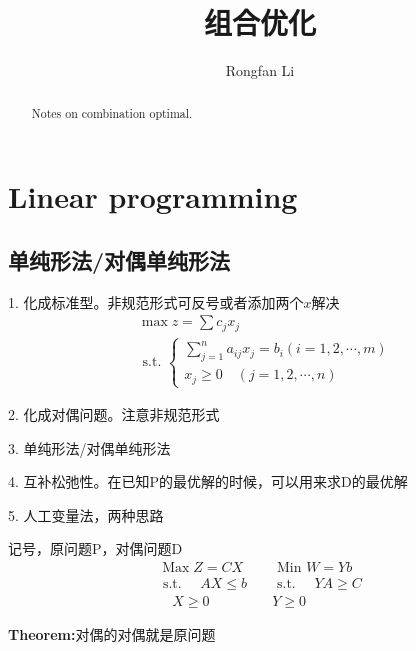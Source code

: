 \documentclass[letterpaper]{article}
\newcommand{\theo}{\textbf{Theorem:}}
\begin{document}
\title{组合优化}
\author{Rongfan Li}
\date{}

\maketitle

\begin{abstract}
	Notes on combination optimal. 
\end{abstract}

\tableofcontents

\clearpage

\section{Linear programming}
% 
\subsection{单纯形法/对偶单纯形法}

1. 化成标准型。非规范形式可反号或者添加两个$x$解决
\begin{equation}\begin{aligned}
	&\max z=\sum c_{j} x_{j}\\
	&\text { s.t. }\left\{\begin{array}{c}
	\sum_{j=1}^{n} a_{i j} x_{j}=b_{i}(i=1,2, \cdots, m) \\
	x_{j} \geq 0 \quad(j=1,2, \cdots, n)
	\end{array}\right.
\end{aligned}\end{equation}


2. 化成对偶问题。注意非规范形式

3. 单纯形法/对偶单纯形法

4. 互补松弛性。在已知P的最优解的时候，可以用来求D的最优解

5. 人工变量法，两种思路

记号，原问题P，对偶问题D
\begin{equation}
	\begin{aligned}
		\operatorname{Max} Z=C X \quad & \text { Min } W=Y b\\
		\text { s.t. } \quad A X \leq b \quad & \text { s.t. } \quad Y A \geq C \\
		\quad X \geq 0 \quad & Y \geq 0
	\end{aligned}
\end{equation}

\theo 对偶的对偶就是原问题
\end{document}
